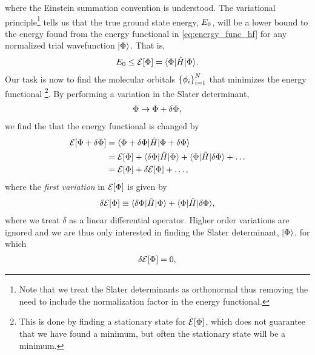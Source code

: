         where the Einstein summation convention is understood.
        The variational principle\footnote{%
            Note that we treat the Slater determinants as orthonormal thus
            removing the need to include the normalization factor in the energy
            functional.
        }
        tells us that the true ground state energy, $E_0$, will be a lower
        bound to the energy found from the energy functional in
        \autoref{eq:energy_func_hf} for any normalized trial wavefunction
        $| \Phi \rangle$.
        That is,
        \begin{align}
            E_0
            \leq \mathcal{E}[\Phi] = \langle \Phi |\hat{H}| \Phi \rangle.
        \end{align}
        Our task is now to find the molecular orbitals $\left\{ \phi_i \right\}_{i =
        1}^{N}$ that minimizes the energy functional%
        \footnote{%
            This is done by finding a stationary state for $\mathcal{E}[\Phi]$,
            which does not guarantee that we have found a minimum, but often the
            stationary state will be a minimum.
        }.
        By performing a variation in the Slater determinant,
        \begin{align}
            \Phi \to \Phi + \delta\Phi,
        \end{align}
        we find the that the energy functional is changed by
        \begin{align}
            \mathcal{E}[\Phi + \delta\Phi]
            &=
            \langle \Phi + \delta\Phi |\hat{H}| \Phi + \delta\Phi \rangle
            \\
            &= \mathcal{E}[\Phi]
            + \langle \delta\Phi |\hat{H}| \Phi \rangle + \langle \Phi |\hat{H}| \delta\Phi \rangle
            + \dots
            \\
            &= \mathcal{E}[\Phi] + \delta\mathcal{E}[\Phi]
            + \dots,
        \end{align}
        where the \emph{first variation} in $\mathcal{E}[\Phi]$ is given by
        \begin{align}
            \delta\mathcal{E}[\Phi]
            \equiv
            \langle \delta\Phi |\hat{H}| \Phi \rangle + \langle \Phi |\hat{H}| \delta\Phi \rangle,
        \end{align}
        where we treat $\delta$ as a linear differential operator.
        Higher order variations are ignored and we are thus only interested in
        finding the Slater determinant, $| \Phi \rangle$, for which
        \begin{align}
            \delta\mathcal{E}[\Phi] = 0,
        \end{align}
